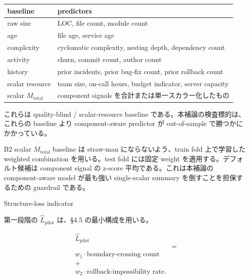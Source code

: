 \documentclass[12pt,a4paper]{article}
\begin{document}
{\def\LTcaptype{table} %
\begin{longtable}[]{@{}
  >{\raggedright\arraybackslash}p{}
  >{\raggedright\arraybackslash}p{}@{}}
\toprule\noalign{}
\begin{minipage}[b]{\linewidth}\raggedright
baseline
\end{minipage} & \begin{minipage}[b]{\linewidth}\raggedright
predictors
\end{minipage} \\
\midrule\noalign{}
\endhead
\bottomrule\noalign{}
\endlastfoot
raw size & LOC, file count, module count \\
age & file age, service age \\
complexity & cyclomatic complexity, nesting depth, dependency count \\
activity & churn, commit count, author count \\
history & prior incidents, prior bug-fix count, prior rollback count \\
scalar resource & team size, on-call hours, budget indicator, server capacity \\
scalar \(M_{\mathrm{total}}\) & component signals を合計または単一スカラー化したもの \\
\end{longtable}
}

これらは quality-blind / scalar-resource baseline である。本補論の検査標的は、これらの baseline より component-aware predictor が out-of-sample で勝つかにかかっている。

B2 scalar \(M_{\mathrm{total}}\) baseline は straw-man にならないよう、train fold 上で学習した weighted combination を用いる。test fold には固定 weight を適用する。デフォルト候補は component signal の z-score 平均である。これは本補論の component-aware model が最も強い single-scalar summary を倒すことを担保するための guardrail である。

Structure-loss indicator

第一段階の \(\hat L_{\mathrm{pilot}}\) は、§4.5 の最小構成を用いる。

\[
\begin{aligned}
\hat L_{\mathrm{pilot}} \\
&= \\
w_1 \cdot \text{boundary-crossing count} \\
+ \\
w_2 \cdot \text{rollback-impossibility rate}.
\end{aligned}
\]
\end{document}

